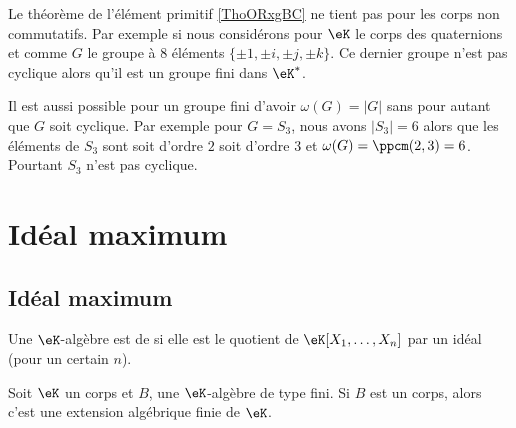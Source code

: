 \begin{example}
    Le théorème de l'élément primitif \ref{ThoORxgBC} ne tient pas pour les corps non commutatifs. Par exemple si nous considérons pour \( \eK\) le corps des quaternions et comme \( G\) le groupe à \( 8\) éléments \( \{ \pm 1,\pm i,\pm j,\pm k \}\). Ce dernier groupe n'est pas cyclique alors qu'il est un groupe fini dans \( \eK^*\).
\end{example}

\begin{example}
    Il est aussi possible pour un groupe fini d'avoir \( \omega(G)=| G |\) sans pour autant que \( G\) soit cyclique. Par exemple pour \( G=S_3\), nous avons \( | S_3 |=6\) alors que les éléments de \( S_3\) sont soit d'ordre \( 2\) soit d'ordre \( 3\) et \( \omega(G)=\ppcm(2,3)=6\). Pourtant \( S_3\) n'est pas cyclique.
\end{example}

\section{Idéal maximum}

\subsection{Idéal maximum}

\begin{definition}  \label{DefWHDdTrC}
    Une \( \eK\)-algèbre est de  si elle est le quotient de \( \eK[X_1,\ldots, X_n]\) par un idéal (pour un certain \( n\)).
\end{definition}

\begin{theorem}      \label{ThonoZyKa}
    Soit \( \eK\) un corps et \( B\), une \( \eK\)-algèbre de type fini. Si \( B\) est un corps, alors c'est une extension algébrique finie de \( \eK\).
\end{theorem}

